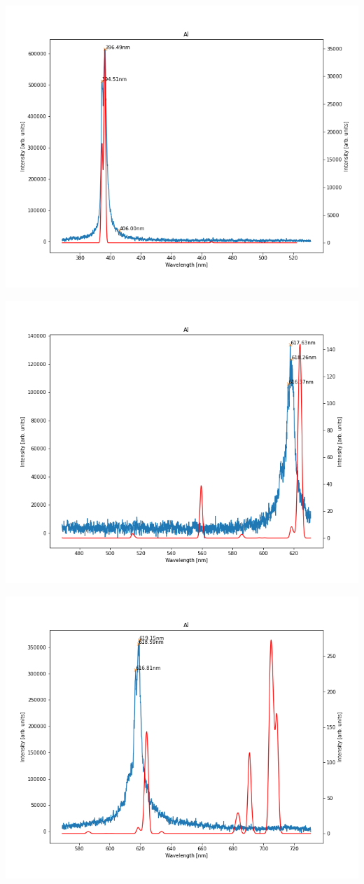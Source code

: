 \documentclass{beamer}
\begin{document}
\begin{frame}
    \includegraphics[scale=0.45]{Al/Al_450nm.png}
\end{frame}

\begin{frame}
    \includegraphics[scale=0.45]{Al/Al_550nm.png}
\end{frame}

\begin{frame}
    \includegraphics[scale=0.45]{Al/Al_650nm.png}
\end{frame}
\end{document}
